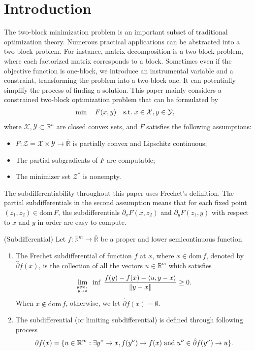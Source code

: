\documentclass{svjour3}                %
\def \R {{\mathbb{R}}}
\def \X {{\mathcal{X}}}
\def \Y {{\mathcal{Y}}}
\def \Z {{\mathcal{Z}}}
\def\nn{\nonumber}
\def\st{\hbox{s.t.}}
\newcommand{\dom}[1]{\mathrm{dom}\,{#1}} %
\begin{document}
\section{Introduction}\label{Intro}
The two-block minimization problem is an important subset of traditional optimization theory. Numerous practical applications can be abstracted into a two-block problem. For instance, matrix decomposition is a two-block problem, where each factorized matrix corresponds to a block. Sometimes even if the objective function is one-block, we introduce an instrumental variable and a constraint, transforming the problem into a two-block one. It can potentially simplify the process of finding a solution. This paper mainly considers a constrained two-block optimization problem that can be formulated by
\begin{equation}
\begin{aligned} \label{P1}
&\min \quad F(x,y) \quad \st \; x \in \X, y\in \Y, 
\end{aligned}
\end{equation}
where $\X,\Y \subset \R^n$ are closed convex sets, and $F$ satisfies the following assumptions:
\begin{itemize}
  \item $F:\Z=\X\times \Y\rightarrow \overline{\R}$ is partially convex and Lipschitz continuous;
  \item The partial subgradients of $F$ are computable;
  \item The minimizer set $\Z^*$ is nonempty.
\end{itemize}
The subdifferentiability throughout this paper uses Frechet's definition. The partial subdifferentials in the second assumption means that for each fixed point $(z_1,z_2)\in\dom F$, the subdifferentials $\partial_x F(x,z_2)$ and $\partial_y F(z_1,y)$ with respect to $x$ and $y$ in order are easy to compute.

\begin{definition}\label{subdiff}
(Subdifferential) Let $f:\R^m \rightarrow \overline{\R}$ be a proper and lower semicontinuous function
\begin{enumerate}
\item The Frechet subdifferential of function $f$ at $x$, where $x\in \dom f$, denoted by $\hat{\partial} f(x)$, is the collection of all the vectors $u\in\R^m$ which satisfies
\begin{equation}
\lim_{y\neq x,\; \atop y\rightarrow x}\; \inf \; \frac{f(y)-f(x)-\langle u,y-x\rangle}{\|y-x\|} \geq 0.\nn
\end{equation}
When $x\notin \dom f$, otherwise, we let $\hat{\partial} f(x)=\emptyset$.
\item The subdifferential (or limiting subdifferential) is defined through following process
\begin{equation}
\partial f(x)=\{u\in\R^m :\exists y^{\nu}\rightarrow x,f(y^{\nu})\rightarrow f(x) \; {\rm and} \; u^{\nu}\in\hat{\partial} f(y^{\nu})\rightarrow u\}.\nn
\end{equation}
\end{enumerate}
\end{definition}
\end{document}
